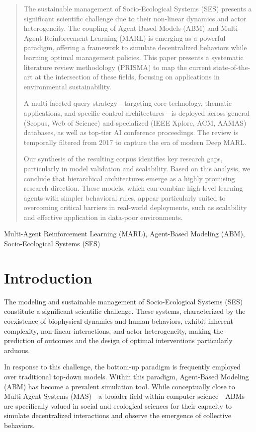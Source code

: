 \documentclass[conference]{IEEEtran}
\begin{document}
\begin{abstract}
The sustainable management of Socio-Ecological Systems (SES) presents a significant scientific challenge due to their non-linear dynamics and actor heterogeneity. The coupling of Agent-Based Models (ABM) and Multi-Agent Reinforcement Learning (MARL) is emerging as a powerful paradigm, offering a framework to simulate decentralized behaviors while learning optimal management policies. This paper presents a systematic literature review methodology (PRISMA) to map the current state-of-the-art at the intersection of these fields, focusing on applications in environmental sustainability.

A multi-faceted query strategy—targeting core technology, thematic applications, and specific control architectures—is deployed across general (Scopus, Web of Science) and specialized (IEEE Xplore, ACM, AAMAS) databases, as well as top-tier AI conference proceedings. The review is temporally filtered from 2017 to capture the era of modern Deep MARL.

Our synthesis of the resulting corpus identifies key research gaps, particularly in model validation and scalability. Based on this analysis, we conclude that hierarchical architectures emerge as a highly promising research direction. These models, which can combine high-level learning agents with simpler behavioral rules, appear particularly suited to overcoming critical barriers in real-world deployments, such as scalability and effective application in data-poor environments.
\end{abstract}

\begin{IEEEkeywords}
Multi-Agent Reinforcement Learning (MARL), Agent-Based Modeling (ABM), Socio-Ecological Systems (SES)
\end{IEEEkeywords}

\section{Introduction}
The modeling and sustainable management of Socio-Ecological Systems (SES) constitute a significant scientific challenge. These systems, characterized by the coexistence of biophysical dynamics and human behaviors, exhibit inherent complexity, non-linear interactions, and actor heterogeneity, making the prediction of outcomes and the design of optimal interventions particularly arduous.

In response to this challenge, the bottom-up paradigm is frequently employed over traditional top-down models. Within this paradigm, Agent-Based Modeling (ABM) has become a prevalent simulation tool. While conceptually close to Multi-Agent Systems (MAS)—a broader field within computer science—ABMs are specifically valued in social and ecological sciences for their capacity to simulate decentralized interactions and observe the emergence of collective behaviors.
\end{document}
